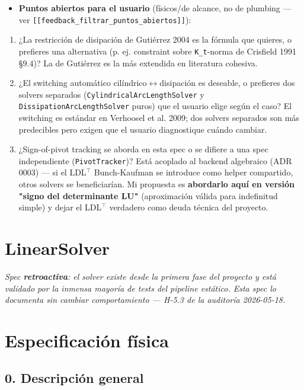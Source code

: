 \documentclass[11pt,letterpaper,oneside]{report}
\begin{document}
\begin{itemize}
  \item \textbf{Puntos abiertos para el usuario} (físicos/de alcance, no de plumbing --- ver \texttt{[[feedback\_filtrar\_puntos\_abiertos]]}):
\end{itemize}
\begin{enumerate}
  \item ¿La restricción de disipación de Gutiérrez 2004 es la fórmula que quieres, o prefieres una alternativa (p. ej. constraint sobre \texttt{K\_t}-norma de Crisfield 1991 §9.4)? La de Gutiérrez es la más extendida en literatura cohesiva.
  \item ¿El switching automático cilíndrico\ensuremath{\leftrightarrow}disipación es deseable, o prefieres dos solvers separados (\texttt{CylindricalArcLengthSolver} y \texttt{DissipationArcLengthSolver} puros) que el usuario elige según el caso? El switching es estándar en Verhoosel et al. 2009; dos solvers separados son más predecibles pero exigen que el usuario diagnostique cuándo cambiar.
  \item ¿Sign-of-pivot tracking se aborda en esta spec o se difiere a una spec independiente (\texttt{PivotTracker})? Está acoplado al backend algebraico (ADR 0003) --- si el LDL\ensuremath{^{\top}} Bunch-Kaufman se introduce como helper compartido, otros solvers se beneficiarían. Mi propuesta es \textbf{abordarlo aquí en versión "signo del determinante LU"} (aproximación válida para indefinitud simple) y dejar el LDL\ensuremath{^{\top}} verdadero como deuda técnica del proyecto.
\end{enumerate}


\newpage

\section{LinearSolver}



\textit{Spec \textbf{retroactiva}: el solver existe desde la primera fase del proyecto y está validado por la inmensa mayoría de tests del pipeline estático. Esta spec lo documenta sin cambiar comportamiento --- H-5.3 de la auditoría 2026-05-18.}



\section{Especificación física}

\subsection{0. Descripción general}
\end{document}
